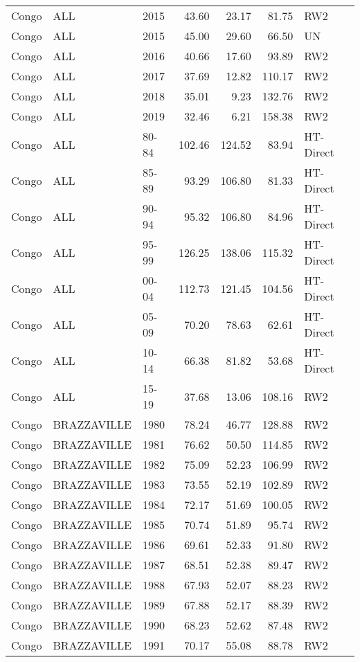 \begin{longtable}{lllrrrl}
  Congo & ALL & 2015 & 43.60 & 23.17 & 81.75 & RW2 \\ 
  Congo & ALL & 2015 & 45.00 & 29.60 & 66.50 & UN \\ 
  Congo & ALL & 2016 & 40.66 & 17.60 & 93.89 & RW2 \\ 
  Congo & ALL & 2017 & 37.69 & 12.82 & 110.17 & RW2 \\ 
  Congo & ALL & 2018 & 35.01 & 9.23 & 132.76 & RW2 \\ 
  Congo & ALL & 2019 & 32.46 & 6.21 & 158.38 & RW2 \\ 
  Congo & ALL & 80-84 & 102.46 & 124.52 & 83.94 & HT-Direct \\ 
  Congo & ALL & 85-89 & 93.29 & 106.80 & 81.33 & HT-Direct \\ 
  Congo & ALL & 90-94 & 95.32 & 106.80 & 84.96 & HT-Direct \\ 
  Congo & ALL & 95-99 & 126.25 & 138.06 & 115.32 & HT-Direct \\ 
  Congo & ALL & 00-04 & 112.73 & 121.45 & 104.56 & HT-Direct \\ 
  Congo & ALL & 05-09 & 70.20 & 78.63 & 62.61 & HT-Direct \\ 
  Congo & ALL & 10-14 & 66.38 & 81.82 & 53.68 & HT-Direct \\ 
  Congo & ALL & 15-19 & 37.68 & 13.06 & 108.16 & RW2 \\ 
  Congo & BRAZZAVILLE & 1980 & 78.24 & 46.77 & 128.88 & RW2 \\ 
  Congo & BRAZZAVILLE & 1981 & 76.62 & 50.50 & 114.85 & RW2 \\ 
  Congo & BRAZZAVILLE & 1982 & 75.09 & 52.23 & 106.99 & RW2 \\ 
  Congo & BRAZZAVILLE & 1983 & 73.55 & 52.19 & 102.89 & RW2 \\ 
  Congo & BRAZZAVILLE & 1984 & 72.17 & 51.69 & 100.05 & RW2 \\ 
  Congo & BRAZZAVILLE & 1985 & 70.74 & 51.89 & 95.74 & RW2 \\ 
  Congo & BRAZZAVILLE & 1986 & 69.61 & 52.33 & 91.80 & RW2 \\ 
  Congo & BRAZZAVILLE & 1987 & 68.51 & 52.38 & 89.47 & RW2 \\ 
  Congo & BRAZZAVILLE & 1988 & 67.93 & 52.07 & 88.23 & RW2 \\ 
  Congo & BRAZZAVILLE & 1989 & 67.88 & 52.17 & 88.39 & RW2 \\ 
  Congo & BRAZZAVILLE & 1990 & 68.23 & 52.62 & 87.48 & RW2 \\ 
  Congo & BRAZZAVILLE & 1991 & 70.17 & 55.08 & 88.78 & RW2 \\ 

\end{longtable}
